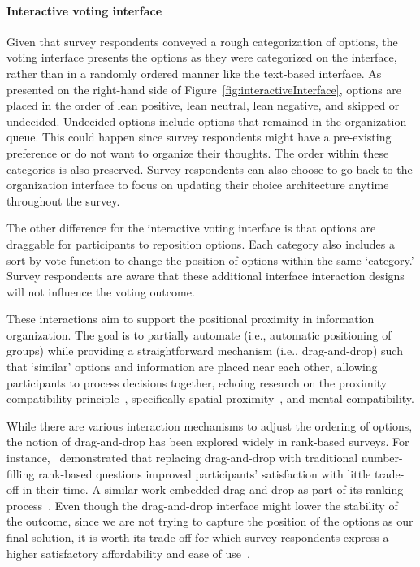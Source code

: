 \paragraph{Interactive voting interface}
Given that survey respondents conveyed a rough categorization of options, the voting interface presents the options as they were categorized on the interface, rather than in a randomly ordered manner like the text-based interface. As presented on the right-hand side of Figure~\ref{fig:interactiveInterface}, options are placed in the order of lean positive, lean neutral, lean negative, and skipped or undecided. Undecided options include options that remained in the organization queue. This could happen since survey respondents might have a pre-existing preference or do not want to organize their thoughts. The order within these categories is also preserved. Survey respondents can also choose to go back to the organization interface to focus on updating their choice architecture anytime throughout the survey.

The other difference for the interactive voting interface is that options are draggable for participants to reposition options. Each category also includes a sort-by-vote function to change the position of options within the same `category.' Survey respondents are aware that these additional interface interaction designs will not influence the voting outcome.

These interactions aim to support the positional proximity in information organization. The goal is to partially automate (i.e., automatic positioning of groups) while providing a straightforward mechanism (i.e., drag-and-drop) such that `similar' options and information are placed near each other, allowing participants to process decisions together, echoing research on the proximity compatibility principle~\cite{wickens1995proximity}, specifically spatial proximity~\cite{wickens1990proximity}, and mental compatibility.

While there are various interaction mechanisms to adjust the ordering of options, the notion of drag-and-drop has been explored widely in rank-based surveys. For instance,~\textcite{krosnick2018measurement} demonstrated that replacing drag-and-drop with traditional number-filling rank-based questions improved participants' satisfaction with little trade-off in their time. A similar work embedded drag-and-drop as part of its ranking process~\cite{timbrook2013comparison}. Even though the drag-and-drop interface might lower the stability of the outcome, since we are not trying to capture the position of the options as our final solution, it is worth its trade-off for which survey respondents express a higher satisfactory affordability and ease of use~\cite{rintoulVisualAnimatedResponse}.

